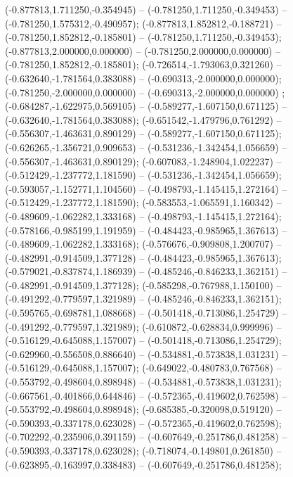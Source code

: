  (-0.877813,1.711250,-0.354945) -- (-0.781250,1.711250,-0.349453) -- (-0.781250,1.575312,-0.490957);
 (-0.877813,1.852812,-0.188721) -- (-0.781250,1.852812,-0.185801) -- (-0.781250,1.711250,-0.349453);
 (-0.877813,2.000000,0.000000) -- (-0.781250,2.000000,0.000000) -- (-0.781250,1.852812,-0.185801);
 (-0.726514,-1.793063,0.321260) -- (-0.632640,-1.781564,0.383088) -- (-0.690313,-2.000000,0.000000);
 (-0.781250,-2.000000,0.000000) -- (-0.690313,-2.000000,0.000000) ;
 (-0.684287,-1.622975,0.569105) -- (-0.589277,-1.607150,0.671125) -- (-0.632640,-1.781564,0.383088);
 (-0.651542,-1.479796,0.761292) -- (-0.556307,-1.463631,0.890129) -- (-0.589277,-1.607150,0.671125);
 (-0.626265,-1.356721,0.909653) -- (-0.531236,-1.342454,1.056659) -- (-0.556307,-1.463631,0.890129);
 (-0.607083,-1.248904,1.022237) -- (-0.512429,-1.237772,1.181590) -- (-0.531236,-1.342454,1.056659);
 (-0.593057,-1.152771,1.104560) -- (-0.498793,-1.145415,1.272164) -- (-0.512429,-1.237772,1.181590);
 (-0.583553,-1.065591,1.160342) -- (-0.489609,-1.062282,1.333168) -- (-0.498793,-1.145415,1.272164);
 (-0.578166,-0.985199,1.191959) -- (-0.484423,-0.985965,1.367613) -- (-0.489609,-1.062282,1.333168);
 (-0.576676,-0.909808,1.200707) -- (-0.482991,-0.914509,1.377128) -- (-0.484423,-0.985965,1.367613);
 (-0.579021,-0.837874,1.186939) -- (-0.485246,-0.846233,1.362151) -- (-0.482991,-0.914509,1.377128);
 (-0.585298,-0.767988,1.150100) -- (-0.491292,-0.779597,1.321989) -- (-0.485246,-0.846233,1.362151);
 (-0.595765,-0.698781,1.088668) -- (-0.501418,-0.713086,1.254729) -- (-0.491292,-0.779597,1.321989);
 (-0.610872,-0.628834,0.999996) -- (-0.516129,-0.645088,1.157007) -- (-0.501418,-0.713086,1.254729);
 (-0.629960,-0.556508,0.886640) -- (-0.534881,-0.573838,1.031231) -- (-0.516129,-0.645088,1.157007);
 (-0.649022,-0.480783,0.767568) -- (-0.553792,-0.498604,0.898948) -- (-0.534881,-0.573838,1.031231);
 (-0.667561,-0.401866,0.644846) -- (-0.572365,-0.419602,0.762598) -- (-0.553792,-0.498604,0.898948);
 (-0.685385,-0.320098,0.519120) -- (-0.590393,-0.337178,0.623028) -- (-0.572365,-0.419602,0.762598);
 (-0.702292,-0.235906,0.391159) -- (-0.607649,-0.251786,0.481258) -- (-0.590393,-0.337178,0.623028);
 (-0.718074,-0.149801,0.261850) -- (-0.623895,-0.163997,0.338483) -- (-0.607649,-0.251786,0.481258);
